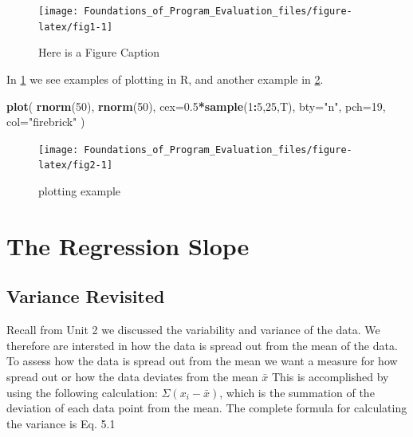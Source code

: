 \documentclass[]{book}
\newenvironment{Shaded}{\begin{snugshade}}{\end{snugshade}}
\newcommand{\DataTypeTok}[1]{\textcolor[rgb]{0.13,0.29,0.53}{#1}}
\newcommand{\DecValTok}[1]{\textcolor[rgb]{0.00,0.00,0.81}{#1}}
\newcommand{\FloatTok}[1]{\textcolor[rgb]{0.00,0.00,0.81}{#1}}
\newcommand{\KeywordTok}[1]{\textcolor[rgb]{0.13,0.29,0.53}{\textbf{#1}}}
\newcommand{\NormalTok}[1]{#1}
\newcommand{\OperatorTok}[1]{\textcolor[rgb]{0.81,0.36,0.00}{\textbf{#1}}}
\newcommand{\StringTok}[1]{\textcolor[rgb]{0.31,0.60,0.02}{#1}}
\theoremstyle{definition}
\theoremstyle{definition}
\theoremstyle{definition}
\theoremstyle{remark}
\begin{document}
\begin{figure}

{\centering \texttt{[image: Foundations\_of\_Program\_Evaluation\_files/figure-latex/fig1-1]} 

}

\caption{Here is a Figure Caption}\label{fig:fig1}
\end{figure}

In \ref{fig:fig1} we see examples of plotting in R, and another example
in \ref{fig:fig2}.

\begin{Shaded}
\begin{Highlighting}[]

\KeywordTok{plot}\NormalTok{( }\KeywordTok{rnorm}\NormalTok{(}\DecValTok{50}\NormalTok{), }\KeywordTok{rnorm}\NormalTok{(}\DecValTok{50}\NormalTok{), }\DataTypeTok{cex=}\FloatTok{0.5}\OperatorTok{*}\KeywordTok{sample}\NormalTok{(}\DecValTok{1}\OperatorTok{:}\DecValTok{5}\NormalTok{,}\DecValTok{25}\NormalTok{,T), }\DataTypeTok{bty=}\StringTok{"n"}\NormalTok{, }\DataTypeTok{pch=}\DecValTok{19}\NormalTok{, }\DataTypeTok{col=}\StringTok{"firebrick"}\NormalTok{ )}
\end{Highlighting}
\end{Shaded}

\begin{figure}

{\centering \texttt{[image: Foundations\_of\_Program\_Evaluation\_files/figure-latex/fig2-1]} 

}

\caption{plotting example}\label{fig:fig2}
\end{figure}

\hypertarget{the-regression-slope}{%
\chapter{The Regression Slope}\label{the-regression-slope}}

\hypertarget{variance-revisited}{%
\section{Variance Revisited}\label{variance-revisited}}

Recall from Unit 2 we discussed the variability and variance of the
data. We therefore are intersted in how the data is spread out from the
mean of the data. To assess how the data is spread out from the mean we
want a measure for how spread out or how the data deviates from the mean
\(\bar{x}\) This is accomplished by using the following calculation:
\(\Sigma(x_{i} - \bar{x})\), which is the summation of the deviation of
each data point from the mean. The complete formula for calculating the
variance is Eq. 5.1
\end{document}
